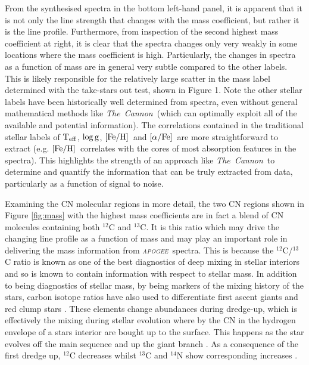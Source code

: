 \documentclass[12pt, preprint]{aastex}
\newcommand{\project}[1]{\textsl{#1}}
\newcommand{\tc}{\project{The~Cannon}}
\newcommand{\apogee}{\project{\textsc{apogee}}}
\newcommand{\teff}{\mbox{$\rm T_{eff}$}}
\newcommand{\feh}{\mbox{$\rm [Fe/H]$}}
\newcommand{\alphafe}{\mbox{$\rm [\alpha/Fe]$}}
\newcommand{\logg}{\mbox{$\rm \log g$}}
\begin{document}
From the synthesised spectra in the bottom left-hand panel, it is apparent that it is not only the line strength that changes with the mass coefficient, but rather it is the line profile. Furthermore, from inspection of the second highest mass coefficient at right, it is clear that the spectra changes only very weakly in some locations where the mass coefficient is high. Particularly, the changes in spectra as a function of mass are in general very subtle compared to the other labels. This is likely responsible for the relatively large scatter in the mass label determined with the take-stars out test, shown in Figure 1. Note the other stellar labels have been historically well determined from spectra, even without general mathematical methods like \tc\ (which can optimally exploit all of the available and potential information). The correlations contained in the traditional stellar labels of \teff, \logg, \feh\ and \alphafe\ are more straightforward to extract (e.g. \feh\ correlates with the cores of most absorption features in the spectra). This highlights the strength of an approach like \tc\ to determine and quantify the information that can be truly extracted from data, particularly as a function of signal to noise. 

Examining the CN molecular regions in more detail, the two CN regions shown in Figure \ref{fig:mass} with the highest mass coefficients are in fact a blend of CN molecules containing both $^{12}$C and $^{13}$C. It is this ratio which may drive the changing line profile as a function of mass and may play an important role in delivering the mass information from \apogee\ spectra. This is because the $^{12}$C/$^{13}$C ratio is known as one of the best diagnostics of deep mixing in stellar interiors and so is known to contain information with respect to stellar mass.  In addition to being diagnostics of stellar mass, by being markers of the mixing history of the stars, carbon isotope ratios have also used to differentiate first ascent giants and red clump stars \citep[see][and references therein]{Taut2013}. These elements change abundances during dredge-up, which is effectively the mixing during stellar evolution where by the CN in the hydrogen envelope of a stars interior are bought up to the surface. This happens as the star evolves off the main sequence and up the giant branch \citep{Gilroy1991}. As a consequence of the first dredge up, $^{12}$C decreases whilst $^{13}$C and $^{14}$N show corresponding increases \citep{Taut2010}. 
\end{document}
